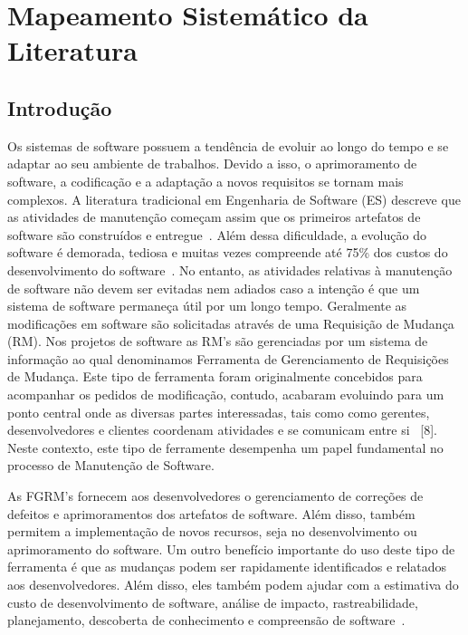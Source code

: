 
\chapter{Mapeamento Sistemático da Literatura}
\label{ch:mapeamento-sistematico}

\section{Introdução}
\label{sec:map-intro}

Os sistemas de software possuem a tendência de evoluir ao longo do tempo e se
adaptar ao seu ambiente de trabalhos. Devido a isso, o aprimoramento de
software, a codificação e a adaptação a novos requisitos se tornam mais
complexos. A literatura tradicional em Engenharia de Software (ES) descreve que
as atividades de manutenção começam assim que os primeiros artefatos de software
são construídos e entregue~\cite{pigoski1996practical}. Além dessa dificuldade,
a evolução do software é demorada, tediosa e muitas vezes compreende até 75\%
dos custos do desenvolvimento do software~\cite{liu2012schedule}.  No entanto,
as atividades relativas à manutenção de software não devem ser evitadas nem
adiados caso a intenção é que um sistema de software permaneça útil por um longo
tempo. Geralmente as modificações em software são solicitadas através de uma
Requisição de Mudança (RM). Nos projetos de software as RM's são gerenciadas por
um sistema de informação ao qual denominamos Ferramenta de Gerenciamento de
Requisições de Mudança. Este tipo de ferramenta foram originalmente concebidos
para acompanhar os pedidos de modificação, contudo, acabaram evoluindo para um
ponto central onde as diversas partes interessadas, tais como  como gerentes,
desenvolvedores e clientes coordenam atividades e se comunicam entre
si~\cite{bertram2010communication} [8]. Neste contexto, este tipo de ferramente
desempenha um papel fundamental no processo de Manutenção de Software.

As FGRM's fornecem aos desenvolvedores o gerenciamento de correções de defeitos
e aprimoramentos dos artefatos de software. Além disso, também permitem a
implementação de novos recursos, seja no desenvolvimento ou aprimoramento do
software. Um outro benefício importante do uso deste tipo de ferramenta é que as
mudanças podem ser rapidamente identificados e relatados aos desenvolvedores.
Além disso, eles também podem ajudar com a estimativa do custo de desenvolvimento
de software, análise de impacto, rastreabilidade, planejamento, descoberta de
conhecimento e compreensão de software~\cite{cavalcanti2013bug}.

